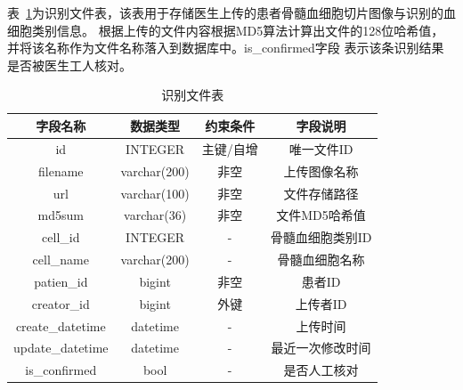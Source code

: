 表~\ref{table:recog_table}为识别文件表，该表用于存储医生上传的患者骨髓血细胞切片图像与识别的血细胞类别信息。
根据上传的文件内容根据MD5算法计算出文件的128位哈希值，并将该名称作为文件名称落入到数据库中。is\_confirmed字段
表示该条识别结果是否被医生工人核对。
\begin{table}
    \caption{识别文件表}   
    \centering 
    \label{table:recog_table}
    \begin{tabular*}{0.9\hsize}{@{}@{\extracolsep{\fill}}cccc@{}}
      \toprule[1pt]
      字段名称  &  数据类型 & 约束条件 & 字段说明 \\
      \midrule[1pt] 
      id           & INTEGER      & 主键/自增    & 唯一文件ID   \\ 
      filename     & varchar(200) & 非空         & 上传图像名称   \\ 
      url          & varchar(100) & 非空         & 文件存储路径   \\ 
      md5sum       & varchar(36)  & 非空         & 文件MD5哈希值 \\
      cell\_id      & INTEGER      & -            & 骨髓血细胞类别ID  \\
      cell\_name    & varchar(200) & -            & 骨髓血细胞名称  \\
      patien\_id   & bigint       & 非空         & 患者ID  \\ 
      creator\_id  & bigint       & 外键         & 上传者ID  \\ 
      create\_datetime & datetime & -    & 上传时间 \\
      update\_datetime & datetime & -    & 最近一次修改时间 \\
      is\_confirmed    & bool     & -    & 是否人工核对 \\
      \bottomrule[1pt]      
    \end{tabular*} 
  \end{table}
